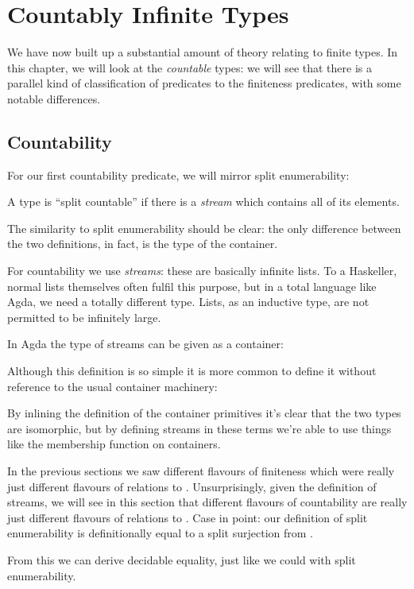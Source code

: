 \chapter{Countably Infinite Types} \label{infinite}
We have now built up a substantial amount of theory relating to finite types.
In this chapter, we will look at the \emph{countable} types: we will see that
there is a parallel kind of classification of predicates to the finiteness
predicates, with some notable differences.
\section{Countability}
For our first countability predicate, we will mirror split enumerability:
\begin{definition}
  A type is ``split countable'' if there is a \emph{stream} which contains all
  of its elements.
  \begin{agdalisting*}
  \end{agdalisting*}
\end{definition}
The similarity to split enumerability should be clear: the only difference
between the two definitions, in fact, is the type of the container.

For countability we use \emph{streams}: these are basically infinite lists.
To a Haskeller, normal lists themselves often fulfil this purpose, but in a
total language like Agda, we need a totally different type.
Lists, as an inductive type, are not permitted to be infinitely large.
\begin{definition}[Streams]
  In Agda the type of streams can be given as a container:
  \begin{agdalisting*}
  \end{agdalisting*}
  Although this definition is so simple it is more common to define it without
  reference to the usual container machinery:
  \begin{agdalisting*}
  \end{agdalisting*}
  By inlining the definition of the container primitives it's clear that the two
  types are isomorphic, but by defining streams in these terms we're able to
  use things like the membership function on containers.
\end{definition}

In the previous sections we saw different flavours of finiteness which were
really just different flavours of relations to .
Unsurprisingly, given the definition of streams, we will see in this section
that different flavours of countability are really just different flavours of
relations to .
Case in point: our definition of split enumerability is definitionally equal to
a split surjection from .
\begin{agdalisting*}
\end{agdalisting*}
From this we can derive decidable equality, just like we could with split
enumerability. 

